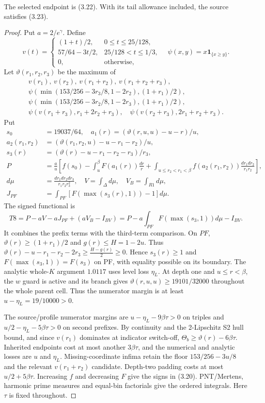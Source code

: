 \begin{lemma}
The selected endpoint is (3.22).
With its tail allowance included, the source satisfies (3.23).
\end{lemma}
\begin{proof}
Put $a=2/e^\gamma$. Define
\[
 v(t)=\begin{cases}(1+t)/2,&0\le t\le25/128,\\
 57/64-3t/2,&25/128<t\le1/3,\\0,&\text{otherwise},\end{cases}
 \quad\psi(x,y)=x\mathbf1_{\{x\ge y\}}.
\]
Let $\vartheta(r_1,r_2,r_3)$ be the maximum of
\[
\begin{gathered}
 v(r_1),\ v(r_2),\ v(r_1+r_2),\ v(r_1+r_2+r_3),\\
 \psi(\min(153/256-3r_3/8,1-2r_2),(1+r_1)/2),\\
 \psi(\min(153/256-3r_2/8,1-2r_3),(1+r_1)/2),\\
 \psi(v(r_1+r_3),r_1+2r_2+r_3),\quad
 \psi(v(r_2+r_3),2r_1+r_2+r_3).
\end{gathered}
\]
Put
\[
\begin{split}
 s_0&=19037/64,\quad
 a_1(r)=(\vartheta(r,u,u)-u-r)/u,\\
 a_2(r_1,r_2)&=(\vartheta(r_1,r_2,u)-u-r_1-r_2)/u,\\
 s_3(r)&=(\vartheta(r)-u-r_1-r_2-r_3)/r_3,\\
 P&=\frac au\left[f(s_0)-\int_u^\beta F(a_1(r))\frac{dr}{r}
 +\int_{u\le r_2<r_1<\beta}f(a_2(r_1,r_2))\frac{dr_1dr_2}{r_1r_2}\right],\\
 d\mu&=\frac{dr_1dr_2dr_3}{r_1r_2r_3^2},\quad
 V=\int_\Delta d\mu,\quad V_B=\int_{R1}d\mu,\\
 J_{PF}&=\int_{PF}[F(\max(s_3(r),1))-1]d\mu.
\end{split}
\]
The signed functional is
\[
 T8=P-aV-aJ_{PF}+(aV_B-I_{BV})
   =P-a\int_{PF}F(\max(s_3,1))d\mu-I_{BV}.
 \tag{3.20}
\]
It combines the prefix terms with the third-term comparison.
On $PF$, $\vartheta(r)\ge(1+r_1)/2$ and $g(r)\le H=1-2u$. Thus
$\vartheta(r)-u-r_1-r_2-2r_3\ge\frac{H-g(r)}2\ge0.$
Hence $s_3(r)\ge1$ and $F(\max(s_3,1))=F(s_3)$ on PF, with equality possible on its boundary.
The analytic whole-$K$ argument $1.0117$ uses level loss $\eta_L$.
At depth one and $u\le r<\beta$, the $w$ guard is active and its
branch gives $\vartheta(r,u,u)\ge19101/32000$ throughout the whole
parent cell. Thus the numerator margin is at least
$u-\eta_L=19/10000>0$.

The source/profile numerator margins are
$u-\eta_L-9\beta\tau>0$ on triples and
$u/2-\eta_L-5\beta\tau>0$ on second prefixes.
By continuity and the 2-Lipschitz S2 hull bound, and since $v(r_1)$ dominates at indicator switch-off,
$\Theta_b\ge\vartheta(r)-6\beta\tau$.
Inherited endpoints cost at most another $3\beta\tau$,
and the numerical and analytic losses are $u$ and $\eta_L$.
Missing-coordinate infima retain the floor $153/256-3u/8$
and the relevant $v(r_1+r_2)$ candidate.
Depth-two padding costs at most $u/2+5\beta\tau$.
Increasing $f$ and decreasing $F$ give the signs in (3.20).
PNT/Mertens, harmonic prime measures and equal-bin factorials give the ordered integrals.
Here $\tau$ is fixed throughout.


\end{proof}
